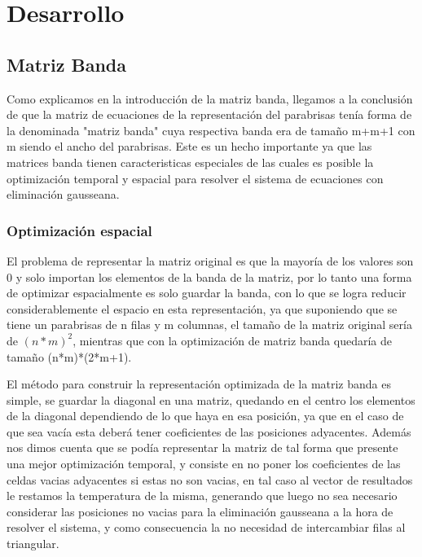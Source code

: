\section{Desarrollo}

\subsection{Matriz Banda}

Como explicamos en la introducción de la matriz banda, llegamos a la conclusión de que la matriz de ecuaciones de la representación del parabrisas tenía forma de la denominada "matriz banda" cuya respectiva banda era de tamaño m+m+1 con m siendo el ancho del parabrisas. Este es un hecho importante ya que las matrices banda tienen caracteristicas especiales de las cuales es posible la optimización temporal y espacial para resolver el sistema de ecuaciones con eliminación gausseana.

\subsubsection{Optimización espacial}

El problema de representar la matriz original es que la mayoría de los valores son 0 y solo importan los elementos de la banda de la matriz, por lo tanto una forma de optimizar espacialmente es solo guardar la banda, con lo que se logra reducir considerablemente el espacio en esta representación, ya que suponiendo que se tiene un parabrisas de n filas y m columnas, el tamaño de la matriz original sería de $(n*m)^2$, mientras que con la optimización de matriz banda quedaría de tamaño (n*m)*(2*m+1).

El método para construir la representación optimizada de la matriz banda es simple, se guardar la diagonal en una matriz, quedando en el centro los elementos de la diagonal dependiendo de lo que haya en esa posición, ya que en el caso de que sea vacía esta deberá tener coeficientes de las posiciones adyacentes. Además nos dimos cuenta que se podía representar la matriz de tal forma que presente una mejor optimización temporal, y consiste en no poner los coeficientes de las celdas vacias adyacentes si estas no son vacias, en tal caso al vector de resultados le restamos la temperatura de la misma, generando que luego no sea necesario considerar las posiciones no vacias para la eliminación gausseana a la hora de resolver el sistema, y como consecuencia la no necesidad de intercambiar filas al triangular.

